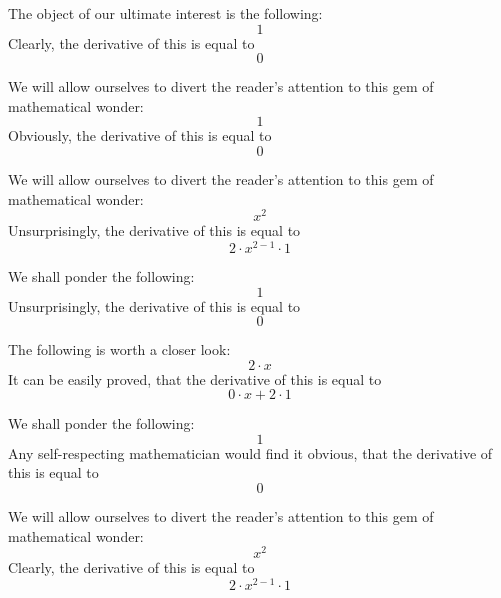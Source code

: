 \documentclass{article}
\begin{document}
The object of our ultimate interest is the following:
\begin{equation}
1 
\end{equation}
Clearly, the derivative of this is equal to
\begin{equation}
0 
\end{equation}

We will allow ourselves to divert the reader's attention to this gem of mathematical wonder:
\begin{equation}
1 
\end{equation}
Obviously, the derivative of this is equal to
\begin{equation}
0 
\end{equation}

We will allow ourselves to divert the reader's attention to this gem of mathematical wonder:
\begin{equation}
x ^{2 } 
\end{equation}
Unsurprisingly, the derivative of this is equal to
\begin{equation}
2 \cdot x ^{2 - 1 } \cdot 1 
\end{equation}

We shall ponder the following:
\begin{equation}
1 
\end{equation}
Unsurprisingly, the derivative of this is equal to
\begin{equation}
0 
\end{equation}

The following is worth a closer look:
\begin{equation}
2 \cdot x 
\end{equation}
It can be easily proved, that the derivative of this is equal to
\begin{equation}
0 \cdot x + 2 \cdot 1 
\end{equation}

We shall ponder the following:
\begin{equation}
1 
\end{equation}
Any self-respecting mathematician would find it obvious, that the derivative of this is equal to
\begin{equation}
0 
\end{equation}

We will allow ourselves to divert the reader's attention to this gem of mathematical wonder:
\begin{equation}
x ^{2 } 
\end{equation}
Clearly, the derivative of this is equal to
\begin{equation}
2 \cdot x ^{2 - 1 } \cdot 1 
\end{equation}
\end{document}
